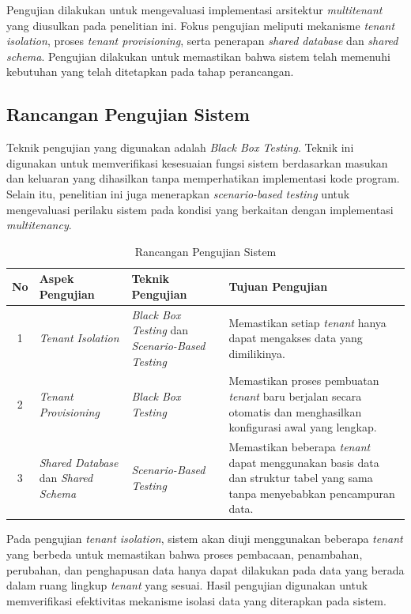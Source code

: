 Pengujian dilakukan untuk mengevaluasi implementasi arsitektur \textit{multitenant} yang diusulkan pada penelitian ini. Fokus pengujian meliputi mekanisme \textit{tenant isolation}, proses \textit{tenant provisioning}, serta penerapan \textit{shared database} dan \textit{shared schema}. Pengujian dilakukan untuk memastikan bahwa sistem telah memenuhi kebutuhan yang telah ditetapkan pada tahap perancangan.

\subsection{Rancangan Pengujian Sistem}

Teknik pengujian yang digunakan adalah \textit{Black Box Testing}. Teknik ini digunakan untuk memverifikasi kesesuaian fungsi sistem berdasarkan masukan dan keluaran yang dihasilkan tanpa memperhatikan implementasi kode program. Selain itu, penelitian ini juga menerapkan \textit{scenario-based testing} untuk mengevaluasi perilaku sistem pada kondisi yang berkaitan dengan implementasi \textit{multitenancy}.

\begin{table}[H]
  \centering
  \caption{Rancangan Pengujian Sistem}
  \label{tab:rancangan_pengujian_sistem}
  \footnotesize
  \begin{tabular}{|c|p{3.5cm}|p{3.5cm}|p{5cm}|}
    \hline
    \rowcolor[HTML]{EFEFEF}
    \textbf{No} & \textbf{Aspek Pengujian} & \textbf{Teknik Pengujian} & \textbf{Tujuan Pengujian} \\
    \hline
    1 & \textit{Tenant Isolation} & \textit{Black Box Testing} dan \textit{Scenario-Based Testing} & Memastikan setiap \textit{tenant} hanya dapat mengakses data yang dimilikinya. \\
    \hline
    2 & \textit{Tenant Provisioning} & \textit{Black Box Testing} & Memastikan proses pembuatan \textit{tenant} baru berjalan secara otomatis dan menghasilkan konfigurasi awal yang lengkap. \\
    \hline
    3 & \textit{Shared Database} dan \textit{Shared Schema} & \textit{Scenario-Based Testing} & Memastikan beberapa \textit{tenant} dapat menggunakan basis data dan struktur tabel yang sama tanpa menyebabkan pencampuran data. \\
    \hline
  \end{tabular}
\end{table}

Pada pengujian \textit{tenant isolation}, sistem akan diuji menggunakan beberapa \textit{tenant} yang berbeda untuk memastikan bahwa proses pembacaan, penambahan, perubahan, dan penghapusan data hanya dapat dilakukan pada data yang berada dalam ruang lingkup \textit{tenant} yang sesuai. Hasil pengujian digunakan untuk memverifikasi efektivitas mekanisme isolasi data yang diterapkan pada sistem.

